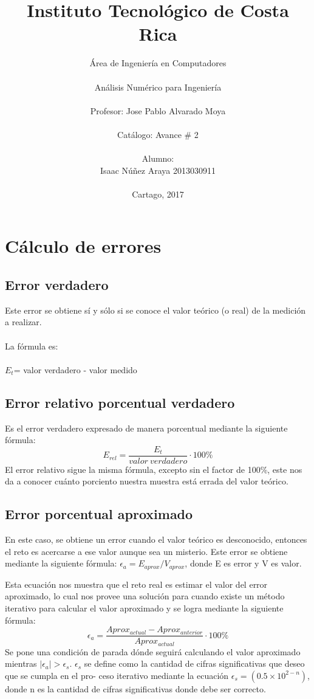 \documentclass[letterpaper, 12pt, twoside]{article}
\title{Instituto Tecnológico de Costa Rica}
\author{Área de Ingeniería en Computadores \\\\
	Análisis Numérico para Ingeniería\\\\
	Profesor: Jose Pablo Alvarado Moya\\\\
	Catálogo: Avance \# 2\\\\
	Alumno:\\
	Isaac Núñez Araya 2013030911\\\\
	Cartago, 2017}
\begin{document}
	\date{}
	\maketitle
	\newpage
	\tableofcontents
	\newpage
	\section{Cálculo de errores}
	\subsection{Error verdadero}
	Este error se obtiene sí y sólo si se conoce el valor teórico (o real) de la medición a realizar.\\\\
	La fórmula es:\\\\
	$E_t$= valor verdadero - valor medido
	\subsection{Error relativo porcentual verdadero}
	Es  el  error  verdadero  expresado  de  manera  porcentual  mediante  la  siguiente  fórmula:
	\begin{equation*}
	E_{rel} = \frac{E_t}{valor~verdadero}\cdot 100\si{\percent}
	\end{equation*}
	El  error  relativo  sigue  la  misma  fórmula,  excepto  sin  el  factor  de  100\%,  este  nos  da  a
	conocer cuánto porciento nuestra muestra está errada del valor teórico.
	\subsection{Error porcentual aproximado}
	En este caso, se obtiene un error cuando el valor teórico es desconocido, entonces el reto es
	acercarse a ese valor aunque sea un misterio.  Este error se obtiene mediante la siguiente
	fórmula: $\epsilon_a = E_{aprox}/V_{aprox}$, donde E es error y V es valor.
	\bigskip
	
	Esta  ecuación  nos  muestra  que  el  reto  real  es  estimar  el  valor  del  error  aproximado,
	lo cual nos provee una solución para cuando existe un método iterativo para calcular el
	valor aproximado y se logra mediante la siguiente fórmula:
	\begin{equation*}
	\epsilon_a = \frac{Aprox_{actual}-Aprox_{anterior}}{Aprox_{actual}}\cdot 100\si{\percent}
	\end{equation*}
	Se pone una condición de parada dónde seguirá calculando el valor aproximado mientras $| \epsilon_a | > \epsilon_s$.
	$\epsilon_s$ se define como la cantidad de cifras significativas que deseo que se cumpla en el pro-
	ceso iterativo mediante la ecuación $\epsilon_s = (0.5\times10^{2-n})$, donde n es la cantidad de cifras significativas donde debe ser correcto.
\end{document}
